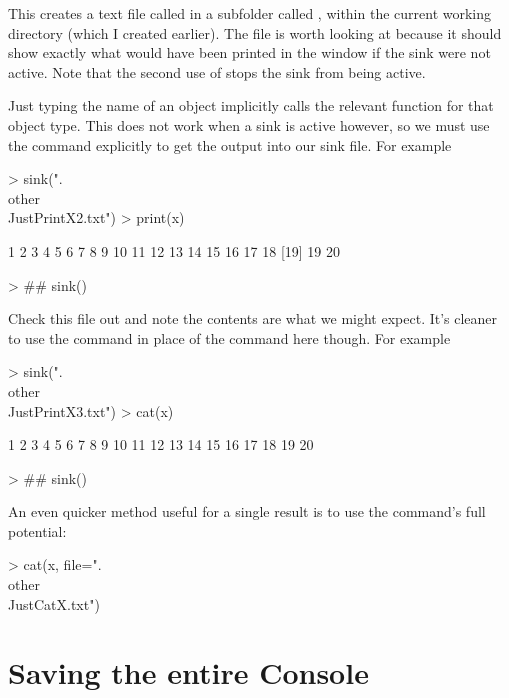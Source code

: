This creates a text file called  in a subfolder called , within the current working directory (which I created earlier). The file is worth looking at because it should show exactly what would have been printed in the \R{} window if the sink were not active. Note that the second use of  stops the sink from being active. 
 
Just typing the name of an object implicitly calls the relevant  function for that object type. This does not work when a sink is active however, so we must use the  command explicitly to get the output into our sink file. For example 
\begin{Schunk}
\begin{Sinput}
> sink(".\\other\\JustPrintX2.txt")
> print(x)
\end{Sinput}
\begin{Soutput}
 [1]  1  2  3  4  5  6  7  8  9 10 11 12 13 14 15 16 17 18
[19] 19 20
\end{Soutput}
\begin{Sinput}
> ## sink()
\end{Sinput}
\end{Schunk}
Check this file out and note the contents are what we might expect. It's cleaner to use the  command in place of the  command here though. For example 
\begin{Schunk}
\begin{Sinput}
> sink(".\\other\\JustPrintX3.txt")
> cat(x)
\end{Sinput}
\begin{Soutput}
1 2 3 4 5 6 7 8 9 10 11 12 13 14 15 16 17 18 19 20
\end{Soutput}
\begin{Sinput}
> ## sink()
\end{Sinput}
\end{Schunk}
An even quicker method useful for a single result is to use the  command's full potential: 
\begin{Schunk}
\begin{Sinput}
> cat(x, file=".\\other\\JustCatX.txt") 
\end{Sinput}
\end{Schunk}
 
 
\section{Saving the entire \R{} Console} 
 
